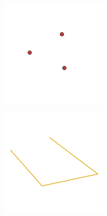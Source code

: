 \begin{figure}[htbp]
	\begin{subfigure}{0.32\textwidth}
		\centering
		\includegraphics[width=.95\textwidth]{img/models_vector_points.png}
	\end{subfigure}
	\begin{subfigure}{0.32\textwidth}
		\centering
		\includegraphics[width=.95\textwidth]{img/models_vector_lines.png}

\end{subfigure}
\end{figure}
